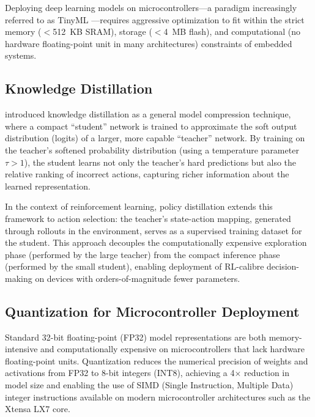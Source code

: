     Deploying deep learning models on microcontrollers---a paradigm increasingly referred to as TinyML \citep{warden2019tinyml}---requires aggressive optimization to fit within the strict memory ($<$512~KB SRAM), storage ($<$4~MB flash), and computational (no hardware floating-point unit in many architectures) constraints of embedded systems.

    \subsection{Knowledge Distillation}

    \citet{hinton2015distilling} introduced knowledge distillation as a general model compression technique, where a compact ``student'' network is trained to approximate the soft output distribution (logits) of a larger, more capable ``teacher'' network. By training on the teacher's softened probability distribution (using a temperature parameter $\tau > 1$), the student learns not only the teacher's hard predictions but also the relative ranking of incorrect actions, capturing richer information about the learned representation.

    In the context of reinforcement learning, policy distillation \citep{ruffy2019distilling} extends this framework to action selection: the teacher's state-action mapping, generated through rollouts in the environment, serves as a supervised training dataset for the student. This approach decouples the computationally expensive exploration phase (performed by the large teacher) from the compact inference phase (performed by the small student), enabling deployment of RL-calibre decision-making on devices with orders-of-magnitude fewer parameters.

    \subsection{Quantization for Microcontroller Deployment}

    Standard 32-bit floating-point (FP32) model representations are both memory-intensive and computationally expensive on microcontrollers that lack hardware floating-point units. Quantization reduces the numerical precision of weights and activations from FP32 to 8-bit integers (INT8), achieving a 4$\times$ reduction in model size and enabling the use of SIMD (Single Instruction, Multiple Data) integer instructions available on modern microcontroller architectures such as the Xtensa LX7 core.

